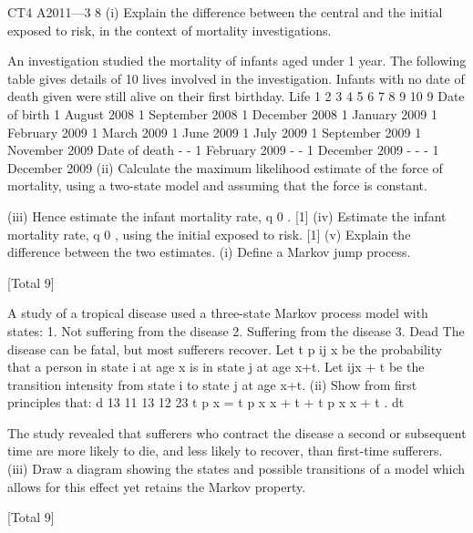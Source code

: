 \documentclass[a4paper,12pt]{article}
\begin{document}
\begin{enumerate}
[Total 8]
CT4 A2011—3
8
(i)
Explain the difference between the central and the initial exposed to
risk, in the context of mortality investigations.

An investigation studied the mortality of infants aged under 1 year. The following table gives details of 10 lives involved in the investigation. Infants with no date of
death given were still alive on their first birthday.
Life
1
2
3
4
5
6
7
8
9
10
9
Date of birth
1 August 2008
1 September 2008
1 December 2008
1 January 2009
1 February 2009
1 March 2009
1 June 2009
1 July 2009
1 September 2009
1 November 2009
Date of death
-
-
1 February 2009
-
-
1 December 2009
-
-
-
1 December 2009
(ii) Calculate the maximum likelihood estimate of the force of mortality, using a
two-state model and assuming that the force is constant.

(iii) Hence estimate the infant mortality rate, q 0 .
[1]
(iv) Estimate the infant mortality rate, q 0 , using the initial exposed to risk.
[1]
(v) Explain the difference between the two estimates.
(i) Define a Markov jump process.

[Total 9]

A study of a tropical disease used a three-state Markov process model with states:
1. Not suffering from the disease
2. Suffering from the disease
3. Dead
The disease can be fatal, but most sufferers recover. Let t p ij x be the probability that a
person in state i at age x is in state j at age x+t. Let \mu ijx + t be the transition intensity
from state i to state j at age x+t.
(ii)
Show from first principles that:
d 13
11 13
12 23
t p x = t p x \mu x + t + t p x \mu x + t .
dt

The study revealed that sufferers who contract the disease a second or subsequent
time are more likely to die, and less likely to recover, than first-time sufferers.
(iii)
Draw a diagram showing the states and possible transitions of a model which
allows for this effect yet retains the Markov property.

[Total 9]


\end{enumerate}
\end{document}
